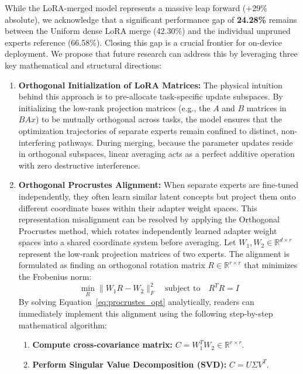 While the LoRA-merged model represents a massive leap forward (+29\% absolute), we acknowledge that a significant performance gap of \textbf{24.28\%} remains between the Uniform dense LoRA merge (42.30\%) and the individual unpruned experts reference (66.58\%). Closing this gap is a crucial frontier for on-device deployment. We propose that future research can address this by leveraging three key mathematical and structural directions:
\begin{enumerate}[leftmargin=*]
    \item \textbf{Orthogonal Initialization of LoRA Matrices:} The physical intuition behind this approach is to pre-allocate task-specific update subspaces. By initializing the low-rank projection matrices (e.g., the $A$ and $B$ matrices in $BAx$) to be mutually orthogonal across tasks, the model ensures that the optimization trajectories of separate experts remain confined to distinct, non-interfering pathways. During merging, because the parameter updates reside in orthogonal subspaces, linear averaging acts as a perfect additive operation with zero destructive interference.
    \item \textbf{Orthogonal Procrustes Alignment:} When separate experts are fine-tuned independently, they often learn similar latent concepts but project them onto different coordinate bases within their adapter weight spaces. This representation misalignment can be resolved by applying the Orthogonal Procrustes method, which rotates independently learned adapter weight spaces into a shared coordinate system before averaging. Let $W_1, W_2 \in \mathbb{R}^{d \times r}$ represent the low-rank projection matrices of two experts. The alignment is formulated as finding an orthogonal rotation matrix $R \in \mathbb{R}^{r \times r}$ that minimizes the Frobenius norm:
    \begin{equation}
        \min_{R} \|W_1 R - W_2\|_F^2 \quad \text{subject to} \quad R^T R = I
        \label{eq:procrustes_opt}
    \end{equation}
    By solving Equation~\ref{eq:procrustes_opt} analytically, readers can immediately implement this alignment using the following step-by-step mathematical algorithm:
    \begin{enumerate}[leftmargin=*, label=\alph*.]
        \item \textbf{Compute cross-covariance matrix:} $C = W_1^T W_2 \in \mathbb{R}^{r \times r}$.
        \item \textbf{Perform Singular Value Decomposition (SVD):} $C = U \Sigma V^T$.

\end{enumerate}
\end{enumerate}
